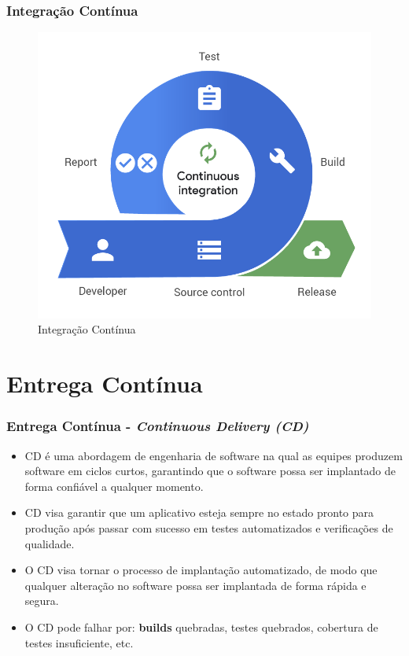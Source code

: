 \documentclass[
	9pt, %
	t, %
]{beamer}
\begin{document}

\begin{frame}
	\frametitle{Integração Contínua}
	\begin{figure}
		\centering
		\includegraphics[width=0.7\linewidth]{cont_integ.png}
		\caption{Integração Contínua}
		\label{fig:ci}
	\end{figure}

\end{frame}


\section{Entrega Contínua}


\begin{frame}
	\frametitle{Entrega Contínua - \textit{Continuous Delivery (CD)}}
	\begin{itemize}
		\item CD é uma abordagem de engenharia de software na qual as equipes produzem software em ciclos curtos, garantindo que o software possa ser implantado de forma confiável a qualquer momento.
		\item CD visa garantir que um aplicativo esteja sempre no estado pronto para produção após passar com sucesso em testes automatizados e verificações de qualidade.
		\item O CD visa tornar o processo de implantação automatizado, de modo que qualquer alteração no software possa ser implantada de forma rápida e segura.
		\item O CD pode falhar por: \textbf{builds} quebradas, testes quebrados, cobertura de testes insuficiente, etc.
	\end{itemize}

\end{frame}
\end{document}
